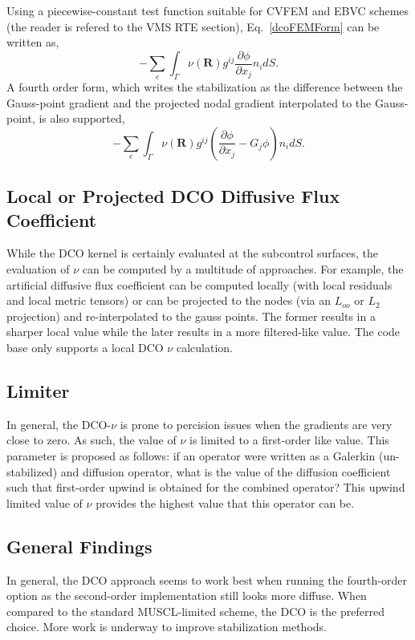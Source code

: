 Using a piecewise-constant test function suitable for CVFEM and EBVC schemes (the reader is refered to 
the VMS RTE section), Eq.~\ref{dcoFEMForm} can be written as,
\begin{equation}
  -\sum_e \int_\Gamma \nu(\mathbf{R}) g^{ij} \frac{\partial \phi} {\partial x_j} n_i dS.
\label{dcoFVForm}
\end{equation}
%
A fourth order form, which writes the stabilization as the difference between the Gauss-point gradient 
and the projected nodal gradient interpolated to the Gauss-point, is also supported,
\begin{equation}
  -\sum_e \int_\Gamma \nu(\mathbf{R}) g^{ij} (\frac{\partial \phi} {\partial x_j} - G_j \phi ) n_i dS.
\label{dcoFVForm4th}
\end{equation}

\subsection{Local or Projected DCO Diffusive Flux Coefficient}
While the DCO kernel is certainly evaluated at the subcontrol surfaces, the evaluation of $\nu$ can be 
computed by a multitude of approaches. For example, the artificial diffusive flux coefficient 
can be computed locally (with local residuals and local metric tensors) or can be projected 
to the nodes (via an $L_{oo}$ or $L_2$ projection) and re-interpolated to the gauss points. 
The former results in a sharper local value while the later results in a more filtered-like value.
The code base only supports a local DCO $\nu$ calculation.

\subsection{Limiter}
In general, the DCO-$\nu$ is prone to percision issues when the gradients are very close to zero. As such, the 
value of $\nu$ is limited to a first-order like value. This parameter is proposed as follows: if an operator
were written as a Galerkin (un-stabilized) and diffusion operator, what is the value of the diffusion coefficient
such that first-order upwind is obtained for the combined operator? This upwind limited value of $\nu$ provides the
highest value that this operator can be.

\subsection{General Findings}
In general, the DCO approach seems to work best when running the fourth-order option as the second-order 
implementation still looks more diffuse. When compared to the standard MUSCL-limited scheme, the DCO
is the preferred choice. More work is underway to improve stabilization methods.
